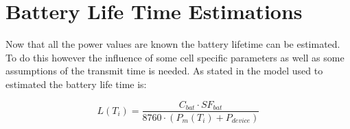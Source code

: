 \section{Battery Life Time Estimations}

Now that all the power values are known the battery lifetime can be estimated. To do this however the influence of some cell specific parameters as well as some assumptions of the transmit time is needed. As stated in  the model used to estimated the battery life time is:

\begin{equation}
L(T_i) = \frac{C_{bat}\cdot SF_{bat}}{8760\cdot (P_m(T_i) + P_{device})}
\end{equation}
\begin{where}
\end{where}

